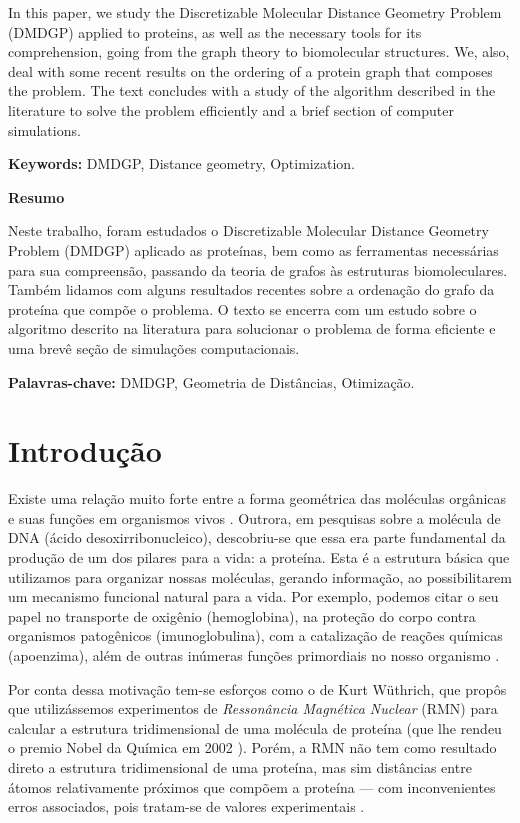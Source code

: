 \documentclass[a4paper,12pt]{article}
\begin{document}
	
		In this paper, we study the Discretizable Molecular Distance Geometry Problem (DMDGP) applied to proteins, as well as the necessary tools for its comprehension, going from the graph theory to biomolecular structures. We, also, deal with some recent results on the ordering of a protein graph that composes the problem. The text concludes with a study of the algorithm described in the literature to solve the problem efficiently and a brief section of computer simulations.
	
	\textbf{Keywords:} DMDGP, Distance geometry, Optimization.
	 
	
	\vspace{2cm}	
	\begin{center}
		\large
		\textbf{Resumo}
	\end{center}
	
	Neste trabalho, foram estudados o Discretizable Molecular Distance Geometry Problem (DMDGP) aplicado as proteínas, bem como as ferramentas necessárias para sua compreensão, passando da teoria de grafos às estruturas biomoleculares. Também lidamos com alguns resultados recentes sobre a ordenação do grafo da proteína que compõe o problema. O texto se encerra com um estudo sobre o algoritmo descrito na literatura para solucionar o problema de forma eficiente e uma brevê seção de simulações computacionais.
	
	\textbf{Palavras-chave:} DMDGP, Geometria de Distâncias, Otimização.
	
	
	\newpage
	\section{Introdução}
	Existe uma relação muito forte entre a forma geométrica das moléculas orgânicas e suas funções em organismos vivos \cite{bioquimicaLehninger}. Outrora, em pesquisas sobre a molécula de DNA (ácido desoxirribonucleico), descobriu-se que essa era parte fundamental da produção de um dos pilares para a vida: a proteína. Esta é a estrutura básica que utilizamos para organizar nossas moléculas, gerando informação, ao possibilitarem um mecanismo funcional natural para a vida. Por exemplo, podemos citar o seu papel no transporte de oxigênio (hemoglobina), na proteção do corpo contra organismos patogênicos (imunoglobulina), com a catalização de reações químicas (apoenzima), além de outras inúmeras funções primordiais no nosso organismo \cite{fidalgotese}.
	
	Por conta dessa motivação tem-se esforços como o de Kurt Wüthrich, que propôs que utilizássemos experimentos de \textit{Ressonância Magnética Nuclear}
	(RMN) para calcular a estrutura tridimensional de uma molécula de proteína (que lhe rendeu o premio Nobel da Química em 2002 \cite{RMNproteinWrutrich}). Porém, a RMN não tem como resultado direto a estrutura tridimensional de uma proteína, mas sim distâncias entre átomos relativamente próximos que compõem a proteína --- com inconvenientes erros associados, pois tratam-se de valores experimentais \cite{carlile:MinimalOrder}.
	
\end{document}
